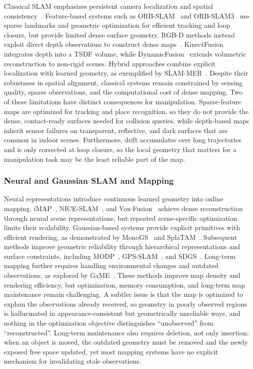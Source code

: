 \documentclass{SCIS2026}
\begin{document}
Classical SLAM emphasizes persistent camera localization and spatial consistency~\cite{cadena2016past}. Feature-based systems such as ORB-SLAM~\cite{mur2015orb} and ORB-SLAM3~\cite{campos2020orb} use sparse landmarks and geometric optimization for efficient tracking and loop closure, but provide limited dense surface geometry. RGB-D methods instead exploit direct depth observations to construct dense maps~\cite{dai2017bundlefusion}. KinectFusion~\cite{izadi2011kinectfusion} integrates depth into a TSDF volume, while DynamicFusion~\cite{newcombe2015dynamicfusion} extends volumetric reconstruction to non-rigid scenes. Hybrid approaches combine explicit localization with learned geometry, as exemplified by SLAM-MER~\cite{piedade2026revisiting}. Despite their robustness in spatial alignment, classical systems remain constrained by sensing quality, sparse observations, and the computational cost of dense mapping. Two of these limitations have distinct consequences for manipulation. Sparse-feature maps are optimized for tracking and place recognition, so they do not provide the dense, contact-ready surfaces needed for collision queries, while depth-based maps inherit sensor failures on transparent, reflective, and dark surfaces that are common in indoor scenes. Furthermore, drift accumulates over long trajectories and is only corrected at loop closure, so the local geometry that matters for a manipulation task may be the least reliable part of the map.

\subsubsection{Neural and Gaussian SLAM and Mapping}

Neural representations introduce continuous learned geometry into online mapping. iMAP~\cite{sucar2021imap}, NICE-SLAM~\cite{zhu2022nice}, and Vox-Fusion~\cite{yang2022vox} achieve dense reconstruction through neural scene representations, but repeated scene-specific optimization limits their scalability. Gaussian-based systems provide explicit primitives with efficient rendering, as demonstrated by MonoGS~\cite{matsuki2024gaussian} and SplaTAM~\cite{keetha2024splatam}. Subsequent methods improve geometric reliability through hierarchical representations and surface constraints, including MODP~\cite{wu2025MODP}, GPS-SLAM~\cite{peng2025gaussian}, and SDGS~\cite{tian2026sdgs}. Long-term mapping further requires handling environmental changes and outdated observations, as explored by GaME~\cite{yugay2026gaussian}. These methods improve map density and rendering efficiency, but optimization, memory consumption, and long-term map maintenance remain challenging. A subtler issue is that the map is optimized to explain the observations already received, so geometry in poorly observed regions is hallucinated in appearance-consistent but geometrically unreliable ways, and nothing in the optimization objective distinguishes ``unobserved'' from ``reconstructed''. Long-term maintenance also requires deletion, not only insertion: when an object is moved, the outdated geometry must be removed and the newly exposed free space updated, yet most mapping systems have no explicit mechanism for invalidating stale observations.
\end{document}
